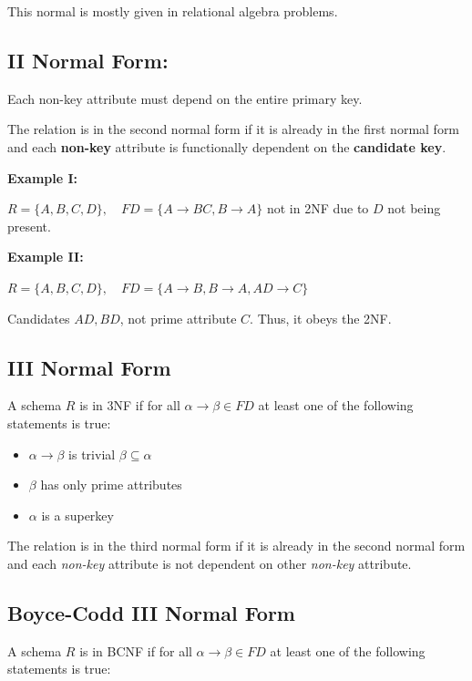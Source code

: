 This normal is mostly given in relational algebra problems.

\subsection{II Normal Form:} 

Each non-key attribute must depend on the entire primary key.

The relation is in the second normal form if it is already in the first normal form and each \textbf{non-key} attribute is functionally dependent on the \textbf{candidate key}.

\textbf{Example I:}

\(R = \{A,B,C,D\}, \quad FD = \{A \to BC, B \to A\}\) not in 2NF due to \(D\) not being present.

\textbf{Example II:}

\(R = \{A,B,C,D\}, \quad FD = \{A \to B, B \to A, AD \to C\}\)

Candidates \(AD, BD\), not prime attribute \(C\). Thus, it obeys the 2NF.

\subsection{III Normal Form} 

A schema \(R\) is in 3NF if for all \( \alpha \to \beta \in FD\) at least one of the following statements 
is true: 

\begin{itemize}

    \item \(\alpha \to \beta\) is trivial \(\beta \subseteq \alpha\)

    \item \(\beta\) has only prime attributes 

    \item \(\alpha\) is a superkey 

\end{itemize}

The relation is in the third normal form if it is already in the second normal form and each \emph{non-key} attribute 
is not dependent on other \emph{non-key} attribute.
 
\subsection{Boyce-Codd III Normal Form} 

A schema \(R\) is in BCNF if for all \( \alpha \to \beta \in FD\) at least one of the following statements 
is true: 

